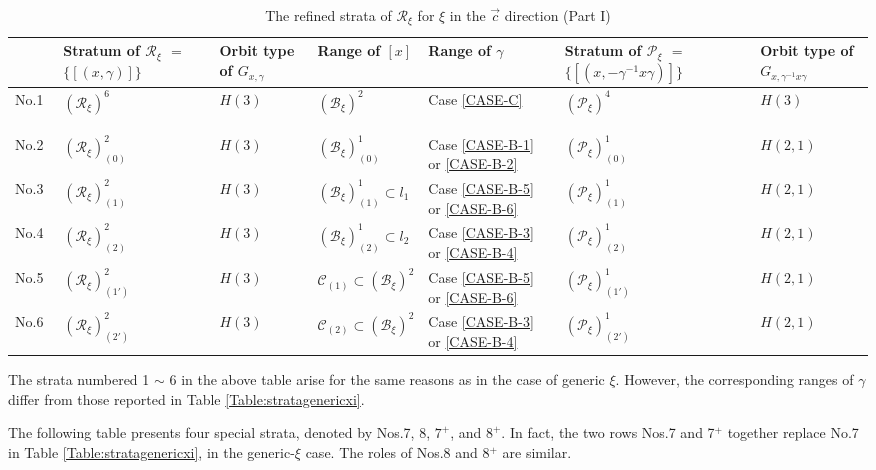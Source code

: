 \documentclass[12pt]{amsart}
\theoremstyle{definition}
\numberwithin{equation}{section}
\newcommand{\Reducedxi}{\mathcal{R}_\xi}
\newcommand{\SET}[1]{\{#1\}}
\newcommand{\Pxi}{\mathcal{P}_{\xi}}
\newcommand{\Bxi}{\mathcal{B}_{\xi}}
\begin{document}
{       \begin{table}[H]\centering
 \caption{The refined strata of  $\Reducedxi  $  for  $\xi$ in the $\vec{c}$ direction (Part I)} \label{Table:strataveccxi1} 
       \begin{supertabular}{|p{0.9cm}|p{2.2cm}| p{1.2cm}|p{2.3cm}|p{2.4cm}|  p{2.6cm} | p{1.5cm}      |  }
 \hline
 &
 Stratum of   $\Reducedxi  $  $=$ $\SET{[(x,\gamma)]}$   &  Orbit type of $G_{x, \gamma}$   & Range of $[x]$ & Range of $\gamma$	   &  Stratum of   $\Pxi $ $=$ $\SET{[(x,-\gamma^{-1}x\gamma)]}$  & Orbit type of $G_{x,\gamma^{-1}x\gamma}$  \\  
  \hline  No.1 ~& 
  $(\Reducedxi)^6  $ &	$H(3)$ & $ (\Bxi)^2   $ & Case \eqref{CASE-C}     & $(\Pxi)^4  $  & $H(3)$ \\ 
  \hline  No.2 ~&
  $(\Reducedxi)^2_{(0)}$ & $H(3)$ &	$ (\Bxi)^1_{(0)}  $ & Case \eqref{CASE-B-1} or \eqref{CASE-B-2}    &  $(\Pxi)^1_{(0)}$ &  $H(2,1)$  \\
\hline  No.3 ~&
  $(\Reducedxi)^2_{(1)}$ & $H(3)$ &	$ (\Bxi)^1_{(1)}  \subset l_1$ & Case \eqref{CASE-B-5} or \eqref{CASE-B-6}    &  $(\Pxi)^1_{(1)}$ &  $H(2,1)$  \\
  \hline  No.4 ~& 
  $(\Reducedxi)^2_{(2)}$ & $H(3)$ &	$ (\Bxi)^1_{(2)}  \subset l_2$ & Case \eqref{CASE-B-3} or \eqref{CASE-B-4}    &  $(\Pxi)^1_{(2)}$ &  $H(2,1)$  \\  
  \hline  No.5 ~&
  $(\Reducedxi)^2_{(1')}$ & $H(3)$ &	$\mathcal{C}_{(1)}\subset (\Bxi)^2   $ & Case \eqref{CASE-B-5} or \eqref{CASE-B-6}    &  $(\Pxi)^1_{(1')}$ & $H(2,1)$   \\
   \hline  No.6 ~&
  $(\Reducedxi)^2_{(2')}$ & $H(3)$ &	$\mathcal{C}_{(2)}\subset (\Bxi)^2   $ & Case \eqref{CASE-B-3}  or \eqref{CASE-B-4}   &  $(\Pxi)^1_{(2')}$ & $H(2,1)$   \\
   \hline  
   \end{supertabular}
   \end{table}
   The strata numbered 1 $\sim$ 6 in the above table arise for the same reasons as in the case of generic \(\xi\). However, the corresponding ranges of \(\gamma\) differ from those reported in Table \ref{Table:stratagenericxi}.

The following table presents four special strata, denoted by Nos.7, 8, \(7^{+}\), and \(8^{+}\). In fact, the two rows  Nos.7 and 7$^+$ together replace No.7   in Table \ref{Table:stratagenericxi}, in the generic-\(\xi\) case. The roles of Nos.8 and 8$^+$ are similar.
    

}
\end{document}
